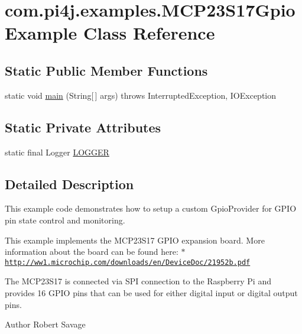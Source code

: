 \hypertarget{classcom_1_1pi4j_1_1examples_1_1MCP23S17GpioExample}{}\section{com.\+pi4j.\+examples.\+M\+C\+P23\+S17\+Gpio\+Example Class Reference}
\label{classcom_1_1pi4j_1_1examples_1_1MCP23S17GpioExample}
\subsection*{Static Public Member Functions}
\begin{DoxyCompactItemize}
\item 
static void \hyperlink{classcom_1_1pi4j_1_1examples_1_1MCP23S17GpioExample_a3896e28c5614767481cd2ac6534ddb28}{main} (String\mbox{[}$\,$\mbox{]} args)  throws Interrupted\+Exception,             I\+O\+Exception 
\end{DoxyCompactItemize}
\subsection*{Static Private Attributes}
\begin{DoxyCompactItemize}
\item 
static final Logger \hyperlink{classcom_1_1pi4j_1_1examples_1_1MCP23S17GpioExample_a89341794ca51e5d836996686d7629055}{L\+O\+G\+G\+E\+R}
\end{DoxyCompactItemize}


\subsection{Detailed Description}
This example code demonstrates how to setup a custom Gpio\+Provider for G\+P\+I\+O pin state control and monitoring. 

This example implements the M\+C\+P23\+S17 G\+P\+I\+O expansion board. More information about the board can be found here\+: $\ast$ \href{http://ww1.microchip.com/downloads/en/DeviceDoc/21952b.pdf}{\tt http\+://ww1.\+microchip.\+com/downloads/en/\+Device\+Doc/21952b.\+pdf} 

The M\+C\+P23\+S17 is connected via S\+P\+I connection to the Raspberry Pi and provides 16 G\+P\+I\+O pins that can be used for either digital input or digital output pins. 

\begin{DoxyAuthor}{Author}
Robert Savage 
\end{DoxyAuthor}


